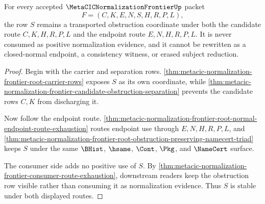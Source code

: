 \begin{theorem}
\label{thm:metacic-normalization-frontier-root-obstruction-stability}
For every accepted $\MetaCICNormalizationFrontierUp$ packet
$$
F=(C,K,E,N,S,H,R,P,L),
$$
the row $S$ remains a transported obstruction coordinate under both the candidate route $C,K,H,R,P,L$ and the endpoint route $E,N,H,R,P,L$. It is never consumed as positive normalization evidence, and it cannot be rewritten as a closed-normal endpoint, a consistency witness, or erased subject reduction.
\end{theorem}
\begin{proof}
Begin with the carrier and separation rows. \autoref{thm:metacic-normalization-frontier-root-carrier-rows} exposes $S$ as its own coordinate, while \autoref{thm:metacic-normalization-frontier-candidate-obstruction-separation} prevents the candidate rows $C,K$ from discharging it.

Now follow the endpoint route. \autoref{thm:metacic-normalization-frontier-root-normal-endpoint-route-exhaustion} routes endpoint use through $E,N,H,R,P,L$, and \autoref{thm:metacic-normalization-frontier-root-obstruction-preserving-namecert-triad} keeps $S$ under the same $\BHist$, $\hsame$, $\Cont$, $\Pkg$, and $\NameCert$ surface.

The consumer side adds no positive use of $S$. By \autoref{thm:metacic-normalization-frontier-consumer-route-exhaustion}, downstream readers keep the obstruction row visible rather than consuming it as normalization evidence. Thus $S$ is stable under both displayed routes.
\end{proof}

